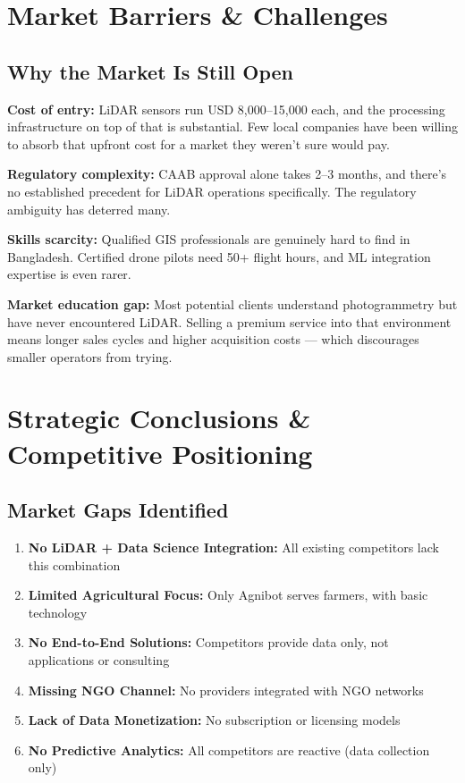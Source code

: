 \section{Market Barriers \& Challenges}

\subsection{Why the Market Is Still Open}

\textbf{Cost of entry:} LiDAR sensors run USD 8,000--15,000 each, and the processing infrastructure on top of that is substantial. Few local companies have been willing to absorb that upfront cost for a market they weren't sure would pay.

\textbf{Regulatory complexity:} CAAB approval alone takes 2--3 months, and there's no established precedent for LiDAR operations specifically. The regulatory ambiguity has deterred many.

\textbf{Skills scarcity:} Qualified GIS professionals are genuinely hard to find in Bangladesh. Certified drone pilots need 50+ flight hours, and ML integration expertise is even rarer.

\textbf{Market education gap:} Most potential clients understand photogrammetry but have never encountered LiDAR. Selling a premium service into that environment means longer sales cycles and higher acquisition costs --- which discourages smaller operators from trying.

\section{Strategic Conclusions \& Competitive Positioning}

\subsection{Market Gaps Identified}

\begin{enumerate}
    \item \textbf{No LiDAR + Data Science Integration:} All existing competitors lack this combination
    \item \textbf{Limited Agricultural Focus:} Only Agnibot serves farmers, with basic technology
    \item \textbf{No End-to-End Solutions:} Competitors provide data only, not applications or consulting
    \item \textbf{Missing NGO Channel:} No providers integrated with NGO networks
    \item \textbf{Lack of Data Monetization:} No subscription or licensing models
    \item \textbf{No Predictive Analytics:} All competitors are reactive (data collection only)
\end{enumerate}

